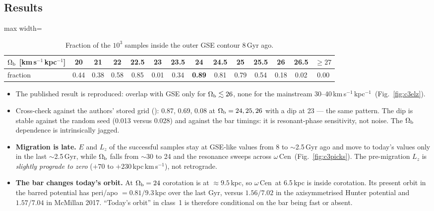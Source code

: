\documentclass[11pt,a4paper]{article}
\newcommand{\kms}{km\,s$^{-1}$}
\newcommand{\kmskpc}{km\,s$^{-1}$\,kpc$^{-1}$}
\newcommand{\ocen}{$\omega$\,Cen}
\newcommand{\Lz}{L_z}
\newcommand{\Ob}{\Omega_{\rm b}}
\begin{document}
\subsection{Results}
\begin{table}[h]\centering
\caption{Fraction of the $10^3$ samples inside the outer GSE contour 8\,Gyr ago.}
\label{tab:c3grid}
\begin{adjustbox}{max width=\linewidth}
\begin{tabular}{l*{13}{c}}\toprule
$\Ob$ [\kmskpc] & 20 & 21 & 22 & 22.5 & 23 & 23.5 & 24 & 24.5 & 25 & 25.5 & 26 & 26.5 & $\ge27$\\\midrule
fraction & 0.44 & 0.38 & 0.58 & 0.85 & 0.01 & 0.34 & \textbf{0.89} & 0.81 & 0.79 & 0.54 & 0.18 & 0.02 & 0.00\\
\bottomrule\end{tabular}
\end{adjustbox}
\end{table}

\begin{itemize}
\item The published result is reproduced: overlap with GSE only for $\Ob\lesssim26$, none for
  the mainstream 30--40\,\kmskpc\ (Fig.~\ref{fig:c3elz}).
\item Cross-check against the authors' stored grid ():
  0.87, 0.69, 0.08 at $\Ob=24,25,26$ with a dip at 23 --- the same pattern. The dip is stable
  against the random seed (0.013 versus 0.028) and against the bar timings: it is
  resonant-phase sensitivity, not noise. The $\Ob$ dependence is intrinsically jagged.
\item \textbf{Migration is late.} $E$ and $\Lz$ of the successful samples stay at GSE-like
  values from 8 to $\sim$2.5\,Gyr ago and move to today's values only in the last
  $\sim$2.5\,Gyr, while $\Ob$ falls from $\sim$30 to 24 and the resonance sweeps across \ocen\
  (Fig.~\ref{fig:c3picks}). The pre-migration $\Lz$ is \emph{slightly prograde to zero}
  ($+70$ to $+230$\,kpc\,\kms), not retrograde.
\item \textbf{The bar changes today's orbit.} At $\Ob=24$ corotation is at $\approx9.5$\,kpc,
  so \ocen\ at 6.5\,kpc is inside corotation. Its present orbit in the barred potential has
  peri/apo $=0.81/9.3$\,kpc over the last Gyr, versus $1.56/7.02$ in the axisymmetrised
  Hunter potential and $1.57/7.04$ in McMillan 2017. ``Today's orbit'' in class~1 is therefore
  conditional on the bar being fast or absent.
\end{itemize}
\end{document}
